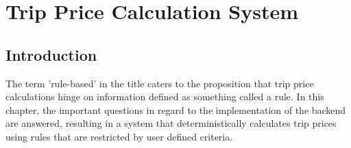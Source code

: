\graphicspath{{Chapter4/Figs/Vector/}{Chapter4/Figs/}}

\chapter{Trip Price Calculation System}
\section{Introduction}
The term 'rule-based' in the title caters to the proposition that trip price calculations hinge on information defined as something called a rule. In this chapter, the important questions in regard to the implementation of the backend are answered, resulting in a system that deterministically calculates trip prices using rules that are restricted by user defined criteria.

